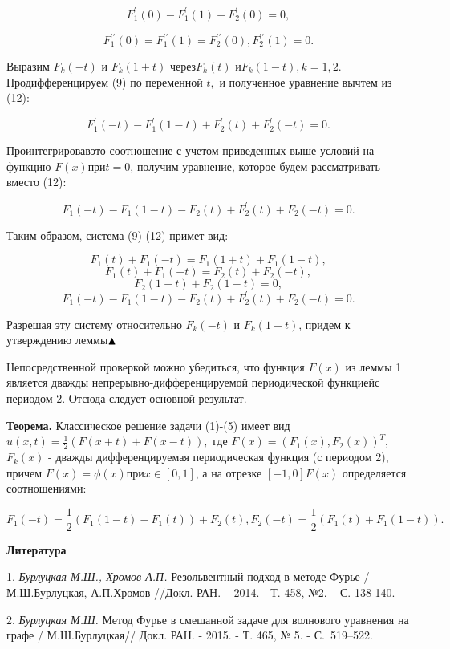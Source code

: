 \[F_{1}^{{'} } \left(0\right)-F_{1}^{{'} } \left(1\right)+F_{2}^{{'} } \left(0\right)=0,\]

\[F_{1}^{{'} {'} } \left(0\right)=F_{1}^{{'} {'} } \left(1\right)=F_{2}^{{'} {'} } \left(0\right),F_{2}^{{'} {'} } \left(1\right)=0.\]

Выразим $F_{k} \left(-t\right)$ и $F_{k} \left(1+t\right)$ через$F_{k} \left(t\right)$ и$F_{k} \left(1-t\right),$$k=1,2.$ Продифференцируем  (9)  по переменной $t,$ и полученное уравнение вычтем из (12):


$$F_{1}^{{'} } \left(-t\right)-F_{1}^{{'} } \left(1-t\right)+F_{2}^{{'} } \left(t\right)+F_{2}^{{'} } \left(-t\right)=0. $$


Проинтегрировавэто соотношение с учетом приведенных выше условий на функцию $F(x)$при$t=0$, получим уравнение, которое будем рассматривать вместо (12):

\[F_{1} \left(-t\right)-F_{1} \left(1-t\right)-F_{2} \left(t\right)+F_{2}^{{'} } \left(t\right)+F_{2} \left(-t\right)=0.\]

Таким образом, система (9)-(12) примет вид:


$$F_{1} \left(t\right)+F_{1} \left(-t\right)=F_{1} \left(1+t\right)+F_{1} \left(1-t\right), $$
$$F_{1} \left(t\right)+F_{1} \left(-t\right)=F_{2} \left(t\right)+F_{2} \left(-t\right),$$
$$F_{2} \left(1+t\right)+F_{2} \left(1-t\right)=0,$$
$${F_{1} \left(-t\right)-F_{1} \left(1-t\right)-F_{2} \left(t\right)+F_{2}^{{'} } \left(t\right)+F_{2} \left(-t\right)=0.} $$


Разрешая эту систему относительно $F_{k} \left(-t\right)$ и $F_{k} \left(1+t\right)$, придем к утверждению леммы${\rm \blacktriangle }$

Непосредственной проверкой можно убедиться, что функция $F(x)$ из леммы 1 является дважды непрерывно-дифференцируемой периодической функциейс периодом 2. Отсюда следует основной результат.

\textbf{Теорема.} Классическое решение задачи (1)-(5) имеет вид $u\left(x,t\right)=\frac{1}{2} \left(F(x+t)+F\left(x-t\right)\right),$ где $F\left(x\right)=\left(F_{1} \left(x\right),F_{2} \left(x\right)\right)^{T} ,$$F_{k} \left(x\right)$ - дважды дифференцируемая периодическая функция (с периодом 2), причем $F\left(x\right)=\phi \left(x\right)$при$x\in \left[0,1\right]$, а на отрезке $\left[-1,0\right]$$F\left(x\right)$ определяется соотношениями:

\[F_{1} \left(-t\right)=\frac{1}{2} \left(F_{1} \left(1-t\right. \right)-\left. F_{1} \left(t\right)\right)+F_{2} \left(t\right),F_{2} \left(-t\right)=\frac{1}{2} \left(F_{1} \left(t\right. \right)+\left. F_{1} \left(1-t\right)\right).\]



\smallskip \centerline{\bf Литература}\nopagebreak

1. {\it Бурлуцкая М.Ш., Хромов А.П.} Резольвентный подход в методе Фурье / М.Ш.Бурлуцкая, А.П.Хромов //Докл. РАН. -- 2014. - Т. 458, №2. -- С. 138-140.

2. {\it Бурлуцкая М.Ш.} Метод Фурье в смешанной задаче для волнового уравнения на графе / М.Ш.Бурлуцкая// Докл. РАН. - 2015. - Т. 465, № 5. - С.~519--522.
